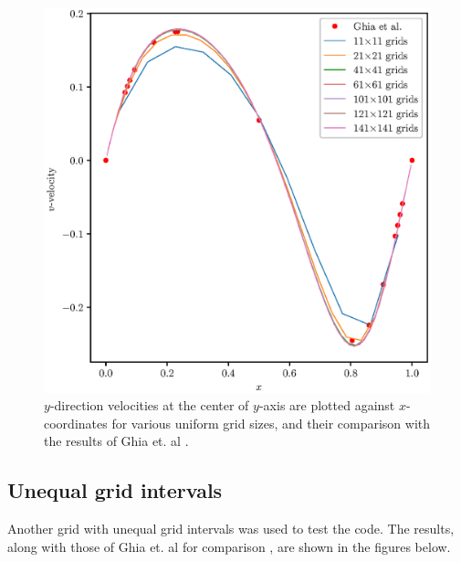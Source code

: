\documentclass[12pt,a4paper,fleqn]{article}
\begin{document}
\begin{figure}[H]
    \centering
    \includegraphics[width=\linewidth]{2Dfinal18051412_cavityFlowV.eps}
    \caption{\(y\)-direction velocities at the center of \(y\)-axis are plotted against \(x\)-coordinates for various uniform grid sizes, and their comparison with the results of Ghia et. al \cite{GHIA1982387}.}
\end{figure}

\pagebreak

\subsection{Unequal grid intervals}
Another grid with unequal grid intervals was used to test the code. The results, along with those of Ghia et. al for comparison \cite{GHIA1982387}, are shown in the figures below.
\end{document}
